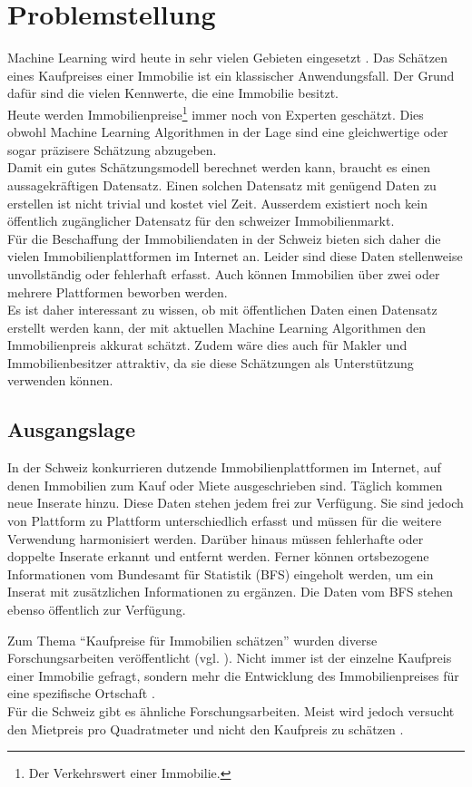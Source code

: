 \section{Problemstellung}
Machine Learning wird heute in sehr vielen Gebieten eingesetzt \cite{forbes}. Das Schätzen eines Kaufpreises einer Immobilie ist ein klassischer Anwendungsfall. Der Grund dafür sind die vielen Kennwerte, die eine Immobilie besitzt.\\
Heute werden Immobilienpreise\footnote{Der Verkehrswert einer Immobilie.} immer noch von Experten geschätzt. Dies obwohl Machine Learning Algorithmen in der Lage sind eine gleichwertige oder sogar präzisere  Schätzung abzugeben.\\
Damit ein gutes Schätzungsmodell berechnet werden kann, braucht es einen aussagekräftigen Datensatz. Einen solchen Datensatz mit genügend Daten zu erstellen ist nicht trivial und kostet viel Zeit. Ausserdem existiert noch kein öffentlich zugänglicher Datensatz für den schweizer Immobilienmarkt.\\
Für die Beschaffung der Immobiliendaten in der Schweiz bieten sich daher die vielen Immobilienplattformen im Internet an. Leider sind diese Daten stellenweise unvollständig oder fehlerhaft erfasst. Auch können Immobilien über zwei oder mehrere Plattformen beworben werden.\\
Es ist daher interessant zu wissen, ob mit öffentlichen Daten einen Datensatz erstellt werden kann, der mit aktuellen Machine Learning Algorithmen den Immobilienpreis akkurat schätzt. Zudem wäre dies auch für Makler und Immobilienbesitzer attraktiv, da sie diese Schätzungen als Unterstützung verwenden können.
%
%
\subsection{Ausgangslage}
In der Schweiz konkurrieren dutzende Immobilienplattformen im Internet, auf denen Immobilien zum Kauf oder Miete ausgeschrieben sind. Täglich kommen neue Inserate hinzu. Diese Daten stehen jedem frei zur Verfügung. Sie sind jedoch von Plattform zu Plattform unterschiedlich erfasst und müssen für die weitere Verwendung harmonisiert werden. Darüber hinaus müssen fehlerhafte oder doppelte Inserate erkannt und entfernt werden. Ferner können ortsbezogene Informationen vom Bundesamt für Statistik (BFS) eingeholt werden, um ein Inserat mit zusätzlichen Informationen zu ergänzen. Die Daten vom BFS stehen ebenso öffentlich zur Verfügung.

Zum Thema “Kaufpreise für Immobilien schätzen” wurden diverse Forschungsarbeiten veröffentlicht (vgl. \cite{existing_work_1, existing_work_2, existing_work_4}).
Nicht immer ist der einzelne Kaufpreis einer Immobilie gefragt, sondern mehr die Entwicklung des Immobilienpreises für eine spezifische Ortschaft \cite{existing_work_5}.\\
Für die Schweiz gibt es ähnliche Forschungsarbeiten. Meist wird jedoch versucht den Mietpreis pro Quadratmeter und nicht den Kaufpreis zu schätzen \cite{existing_work_3, existing_work_6}.
%
